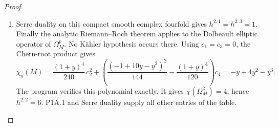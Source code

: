 \begin{proof}
\begin{enumerate}[label=\arabic*.]
\item Serre duality \cite[Theorem 4, p.~22]{Serre1955Duality} on this compact smooth complex fourfold gives
$h^{2,1}=h^{2,3}=1$. Finally the analytic Riemann--Roch theorem
\cite[Theorem 25.3.1, p.~187; \S25.4(a), pp.~188--190]{HirzebruchTopologicalMethods} applies to the Dolbeault elliptic
operator of $\Omega_M^p$. No Kähler hypothesis occurs there.
Using $c_1=c_3=0$, the Chern-root product gives
\[
\chi_y(M)=
\frac{(1+y)^4}{240}\,c_2^2+
\left(\frac{(-1+10y-y^2)^2}{144}
       -\frac{(1+y)^4}{120}\right)c_4
=-y+4y^2-y^3.
\]
The program verifies this polynomial exactly. It gives
$\chi(\Omega_M^2)=4$, hence $h^{2,2}=6$.
P1A.1 and Serre duality supply all other entries of the table.

\end{enumerate}
\end{proof}




